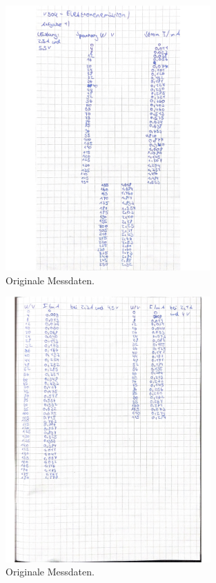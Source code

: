 \begin{figure}[H]
    \centering
    \includegraphics[width=0.7\textwidth]{data/origDaten1.jpg}
    \caption{Originale Messdaten.}
    \label{fig:origDaten1}
\end{figure}

\begin{figure}[H]
    \centering
    \includegraphics[width=0.7\textwidth]{data/origDaten2.jpg}
    \caption{Originale Messdaten.}
    \label{fig:origDaten2}
\end{figure}

